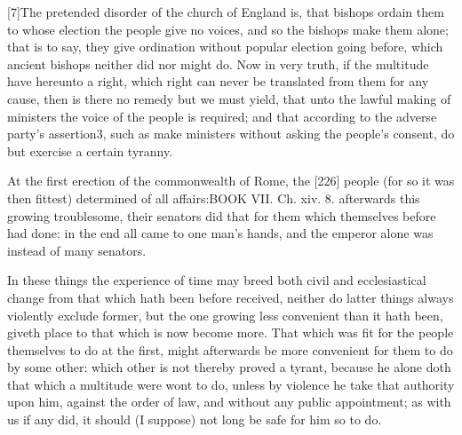 [7]The pretended disorder of the church of England is, that bishops ordain them to whose election the people give no voices, and so the bishops make them alone; that is to say, they give ordination without popular election going before, which ancient bishops neither did nor might do. Now in very truth, if the multitude have hereunto a right, which right can never be translated from them for any cause, then is there no remedy but we must yield, that unto the lawful making of ministers the voice of the people is required; and that according to the adverse party’s assertion3, such as make ministers without asking the people’s consent, do but exercise a certain tyranny.

At the first erection of the commonwealth of Rome, the [226] people (for so it was then fittest) determined of all affairs:BOOK VII. Ch. xiv. 8. afterwards this growing troublesome, their senators did that for them which themselves before had done: in the end all came to one man’s hands, and the emperor alone was instead of many senators.

In these things the experience of time may breed both civil and ecclesiastical change from that which hath been before received, neither do latter things always violently exclude former, but the one growing less convenient than it hath been, giveth place to that which is now become more. That which was fit for the people themselves to do at the first, might afterwards be more convenient for them to do by some other: which other is not thereby proved a tyrant, because he alone doth that which a multitude were wont to do, unless by violence he take that authority upon him, against the order of law, and without any public appointment; as with us if any did, it should (I suppose) not long be safe for him so to do.

